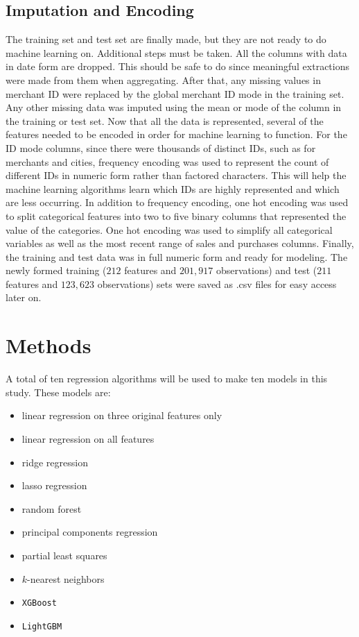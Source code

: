 \documentclass[journal, a4paper]{IEEEtran}
\begin{document}
\subsection{Imputation and Encoding}
The training set and test set are finally made, but they are not ready to do machine learning on. Additional steps must be taken. All the columns with data in date form are dropped. This should be safe to do since meaningful extractions were made from them when aggregating. After that, any missing values in merchant ID were replaced by the global merchant ID mode in the training set. Any other missing data was imputed using the mean or mode of the column in the training or test set. Now that all the data is represented, several of the features needed to be encoded in order for machine learning to function. For the ID mode columns, since there were thousands of distinct IDs, such as for merchants and cities, frequency encoding was used to represent the count of different IDs in numeric form rather than factored characters. This will help the machine learning algorithms learn which IDs are highly represented and which are less occurring. In addition to frequency encoding, one hot encoding was used to split categorical features into two to five binary columns that represented the value of the categories. One hot encoding was used to simplify all categorical variables as well as the most recent range of sales and purchases columns. Finally, the training and test data was in full numeric form and ready for modeling. The newly formed training ($212$ features and $201,917$ observations) and test ($211$ features and $123,623$ observations) sets were saved as .csv files for easy access later on. 

\section{Methods}
A total of ten regression algorithms will be used to make ten models in this study. These models are: 
\begin{itemize} 
\item linear regression on three original features only
\item linear regression on all features 
\item ridge regression
\item lasso regression
\item random forest
\item principal components regression
\item partial least squares 
\item $k$-nearest neighbors
\item \texttt{XGBoost}
\item \texttt{LightGBM} 
\end{itemize} 
\end{document}
